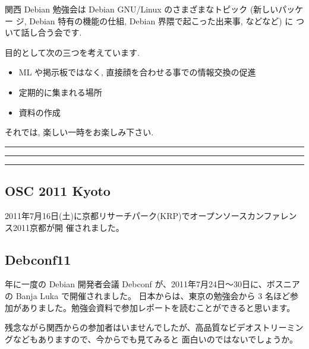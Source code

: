 \documentclass[mingoth,a4paper]{jsarticle}
\begin{document}
関西 Debian 勉強会は Debian GNU/Linux のさまざまなトピック (新しいパッケー
ジ, Debian 特有の機能の仕組, Debian 界隈で起こった出来事, などなど) に
ついて話し合う会です.

目的として次の三つを考えています.
\begin{itemize}
      \item ML や掲示板ではなく, 直接顔を合わせる事での情報交換の促進
      \item 定期的に集まれる場所
      \item 資料の作成
\end{itemize}

それでは, 楽しい一時をお楽しみ下さい.

\clearpage

\begin{minipage}[b]{0.2\hsize}
 {}
\end{minipage}
\begin{minipage}[b]{0.8\hsize}
\hrule
\vspace{2mm}
\hrule
\setcounter{tocdepth}{1}
\tableofcontents
\vspace{2mm}
\hrule
\end{minipage}



\subsection{OSC 2011 Kyoto}

2011年7月16日(土)に京都リサーチパーク(KRP)でオープンソースカンファレンス2011京都が開
催されました。

\subsection{Debconf11}

年に一度の Debian 開発者会議 Debconf が、2011年7月24日〜30日に、ボスニアの Banja Luka で開催されました。
日本からは、東京の勉強会から 3 名ほど参加がありました。勉強会資料で参加レポートを読むことができると思います。

残念ながら関西からの参加者はいませんでしたが、高品質なビデオストリーミングなどもありますので、今からでも見てみると
面白いのではないでしょうか。


\clearpage
\end{document}
